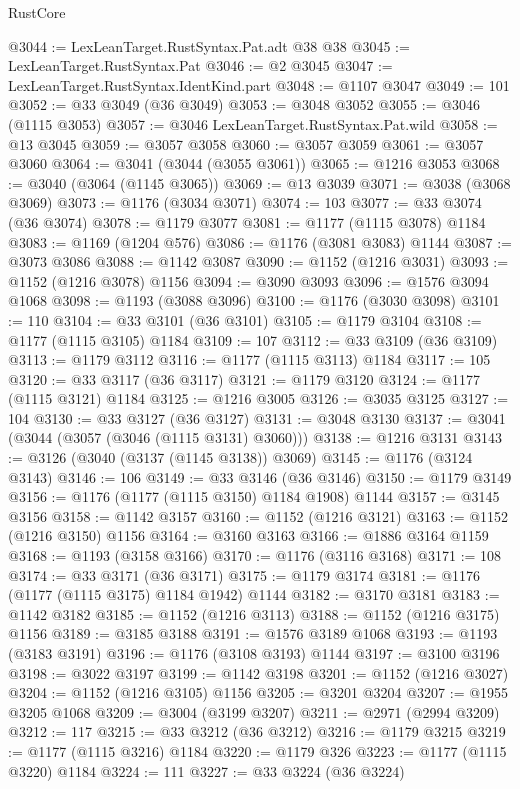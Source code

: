 \begin{lexlean}{RustCore}
\begin{coremodule}
@3044 := LexLeanTarget.RustSyntax.Pat.adt @38 @38
@3045 := LexLeanTarget.RustSyntax.Pat
@3046 := @2 @3045
@3047 := LexLeanTarget.RustSyntax.IdentKind.part
@3048 := @1107 @3047
@3049 := 101
@3052 := @33 @3049 (@36 @3049)
@3053 := @3048 @3052
@3055 := @3046 (@1115 @3053)
@3057 := @3046 LexLeanTarget.RustSyntax.Pat.wild
@3058 := @13 @3045
@3059 := @3057 @3058
@3060 := @3057 @3059
@3061 := @3057 @3060
@3064 := @3041 (@3044 (@3055 @3061))
@3065 := @1216 @3053
@3068 := @3040 (@3064 (@1145 @3065))
@3069 := @13 @3039
@3071 := @3038 (@3068 @3069)
@3073 := @1176 (@3034 @3071)
@3074 := 103
@3077 := @33 @3074 (@36 @3074)
@3078 := @1179 @3077
@3081 := @1177 (@1115 @3078) @1184
@3083 := @1169 (@1204 @576)
@3086 := @1176 (@3081 @3083) @1144
@3087 := @3073 @3086
@3088 := @1142 @3087
@3090 := @1152 (@1216 @3031)
@3093 := @1152 (@1216 @3078) @1156
@3094 := @3090 @3093
@3096 := @1576 @3094 @1068
@3098 := @1193 (@3088 @3096)
@3100 := @1176 (@3030 @3098)
@3101 := 110
@3104 := @33 @3101 (@36 @3101)
@3105 := @1179 @3104
@3108 := @1177 (@1115 @3105) @1184
@3109 := 107
@3112 := @33 @3109 (@36 @3109)
@3113 := @1179 @3112
@3116 := @1177 (@1115 @3113) @1184
@3117 := 105
@3120 := @33 @3117 (@36 @3117)
@3121 := @1179 @3120
@3124 := @1177 (@1115 @3121) @1184
@3125 := @1216 @3005
@3126 := @3035 @3125
@3127 := 104
@3130 := @33 @3127 (@36 @3127)
@3131 := @3048 @3130
@3137 := @3041 (@3044 (@3057 (@3046 (@1115 @3131) @3060)))
@3138 := @1216 @3131
@3143 := @3126 (@3040 (@3137 (@1145 @3138)) @3069)
@3145 := @1176 (@3124 @3143)
@3146 := 106
@3149 := @33 @3146 (@36 @3146)
@3150 := @1179 @3149
@3156 := @1176 (@1177 (@1115 @3150) @1184 @1908) @1144
@3157 := @3145 @3156
@3158 := @1142 @3157
@3160 := @1152 (@1216 @3121)
@3163 := @1152 (@1216 @3150) @1156
@3164 := @3160 @3163
@3166 := @1886 @3164 @1159
@3168 := @1193 (@3158 @3166)
@3170 := @1176 (@3116 @3168)
@3171 := 108
@3174 := @33 @3171 (@36 @3171)
@3175 := @1179 @3174
@3181 := @1176 (@1177 (@1115 @3175) @1184 @1942) @1144
@3182 := @3170 @3181
@3183 := @1142 @3182
@3185 := @1152 (@1216 @3113)
@3188 := @1152 (@1216 @3175) @1156
@3189 := @3185 @3188
@3191 := @1576 @3189 @1068
@3193 := @1193 (@3183 @3191)
@3196 := @1176 (@3108 @3193) @1144
@3197 := @3100 @3196
@3198 := @3022 @3197
@3199 := @1142 @3198
@3201 := @1152 (@1216 @3027)
@3204 := @1152 (@1216 @3105) @1156
@3205 := @3201 @3204
@3207 := @1955 @3205 @1068
@3209 := @3004 (@3199 @3207)
@3211 := @2971 (@2994 @3209)
@3212 := 117
@3215 := @33 @3212 (@36 @3212)
@3216 := @1179 @3215
@3219 := @1177 (@1115 @3216) @1184
@3220 := @1179 @326
@3223 := @1177 (@1115 @3220) @1184
@3224 := 111
@3227 := @33 @3224 (@36 @3224)

\end{coremodule}
\end{lexlean}
